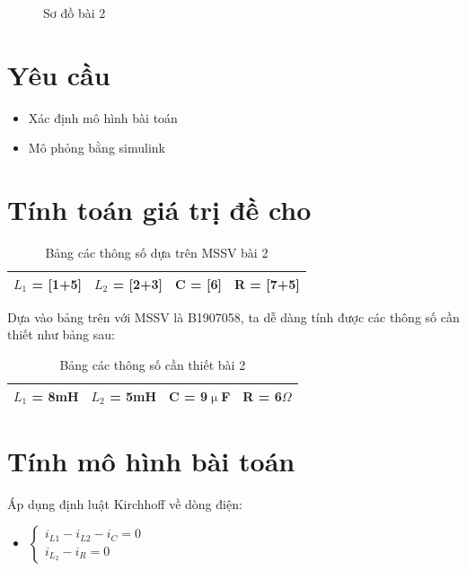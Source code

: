 \documentclass{standalone}
\begin{document}
	\begin{figure}[!htp]
		\centering
		
		\caption{Sơ đồ bài 2}
		\label{b2-diagram}
	\end{figure}
	
	\section{Yêu cầu}%
	\begin{itemize}
		\item Xác định mô hình bài toán
		\item Mô phỏng bằng simulink
	\end{itemize}	
	
	
	
	\section{Tính toán giá trị đề cho}%
	\begin{table}[!htp]
		\centering
		\begin{tabular}{|l|l|l|l|}
			\hline $L_1$ = [1+5] & $L_2$ = [2+3] & C = [6] & R = [7+5]\\
			\hline
		\end{tabular}
		\caption{Bảng các thông số dựa trên MSSV bài 2}
		\label{b2-para-table}
	\end{table}
	
	Dựa vào bảng trên với MSSV là B1907058, ta dễ dàng tính được các thông số cần thiết như bảng sau:\\
	
	\begin{table}[!htp]
		\centering
		\begin{tabular}{|l|l|l|l|}
			\hline $L_1$ = 8mH & $L_2$ = 5mH & C = 9$\upmu$F & R = 6$\Omega$\\
			\hline
		\end{tabular}
		\caption{Bảng các thông số cần thiết bài 2}
		\label{b2-value-table}
	\end{table}
	
	\section{Tính mô hình bài toán}%
	Áp dụng định luật Kirchhoff về dòng điện:
	\begin{itemize}
		\item [] $
		\begin{cases}
			i_{L1} - i_{L2} - i_C = 0\\
			i_{L_2} - i_R = 0
		\end{cases}
		$
	\end{itemize}
	
\end{document}
